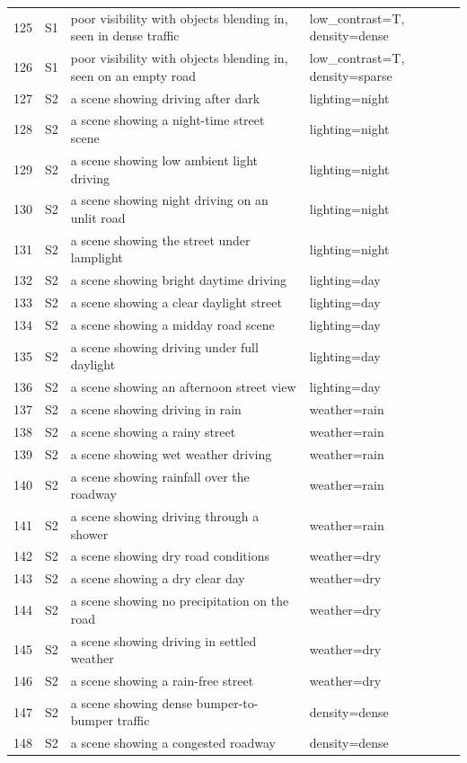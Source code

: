 \begin{longtable}{r l p{8.6cm} p{5.6cm}}
125 & S1 & poor visibility with objects blending in, seen in dense traffic & low\_contrast=T, density=dense\\
126 & S1 & poor visibility with objects blending in, seen on an empty road & low\_contrast=T, density=sparse\\
127 & S2 & a scene showing driving after dark & lighting=night\\
128 & S2 & a scene showing a night-time street scene & lighting=night\\
129 & S2 & a scene showing low ambient light driving & lighting=night\\
130 & S2 & a scene showing night driving on an unlit road & lighting=night\\
131 & S2 & a scene showing the street under lamplight & lighting=night\\
132 & S2 & a scene showing bright daytime driving & lighting=day\\
133 & S2 & a scene showing a clear daylight street & lighting=day\\
134 & S2 & a scene showing a midday road scene & lighting=day\\
135 & S2 & a scene showing driving under full daylight & lighting=day\\
136 & S2 & a scene showing an afternoon street view & lighting=day\\
137 & S2 & a scene showing driving in rain & weather=rain\\
138 & S2 & a scene showing a rainy street & weather=rain\\
139 & S2 & a scene showing wet weather driving & weather=rain\\
140 & S2 & a scene showing rainfall over the roadway & weather=rain\\
141 & S2 & a scene showing driving through a shower & weather=rain\\
142 & S2 & a scene showing dry road conditions & weather=dry\\
143 & S2 & a scene showing a dry clear day & weather=dry\\
144 & S2 & a scene showing no precipitation on the road & weather=dry\\
145 & S2 & a scene showing driving in settled weather & weather=dry\\
146 & S2 & a scene showing a rain-free street & weather=dry\\
147 & S2 & a scene showing dense bumper-to-bumper traffic & density=dense\\
148 & S2 & a scene showing a congested roadway & density=dense\\

\end{longtable}
